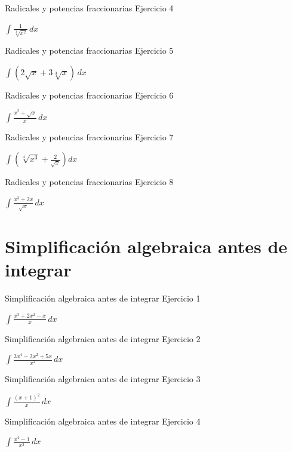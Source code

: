 \documentclass[10pt,aspectratio=169]{beamer}
\newcommand{\ejercicio}[1]{%
  \begin{center}
  \vfill
  {\fontsize{24}{30}\selectfont #1}
  \vfill
  \end{center}
}
\begin{document}
\begin{frame}{Radicales y potencias fraccionarias}
\small Ejercicio 4
\ejercicio{$\displaystyle \int \frac{1}{\sqrt[3]{x^2}}\,dx$}
\end{frame}

\begin{frame}{Radicales y potencias fraccionarias}
\small Ejercicio 5
\ejercicio{$\displaystyle \int(2\sqrt{x}+3\sqrt[3]{x})\,dx$}
\end{frame}

\begin{frame}{Radicales y potencias fraccionarias}
\small Ejercicio 6
\ejercicio{$\displaystyle \int\frac{x^2+\sqrt{x}}{x}\,dx$}
\end{frame}

\begin{frame}{Radicales y potencias fraccionarias}
\small Ejercicio 7
\ejercicio{$\displaystyle \int\left(\sqrt[4]{x^3}+\frac{2}{\sqrt{x}}\right)dx$}
\end{frame}

\begin{frame}{Radicales y potencias fraccionarias}
\small Ejercicio 8
\ejercicio{$\displaystyle \int\frac{x^3+2x}{\sqrt{x}}\,dx$}
\end{frame}

\section{Simplificación algebraica antes de integrar}
\begin{frame}{Simplificación algebraica antes de integrar}
\small Ejercicio 1
\ejercicio{$\displaystyle \int\frac{x^3+2x^2-x}{x}\,dx$}
\end{frame}

\begin{frame}{Simplificación algebraica antes de integrar}
\small Ejercicio 2
\ejercicio{$\displaystyle \int\frac{3x^4-2x^2+5x}{x^2}\,dx$}
\end{frame}

\begin{frame}{Simplificación algebraica antes de integrar}
\small Ejercicio 3
\ejercicio{$\displaystyle \int\frac{(x+1)^2}{x}\,dx$}
\end{frame}

\begin{frame}{Simplificación algebraica antes de integrar}
\small Ejercicio 4
\ejercicio{$\displaystyle \int\frac{x^4-1}{x^2}\,dx$}
\end{frame}
\end{document}
